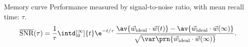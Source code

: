 \documentclass[final,hyperref={pdfpagelabels=false,bookmarks=false}]{beamer}
\DeclareMathOperator{\SNR}{SNR}
\DeclareMathOperator{\snr}{SNR}
\newcommand{\snrb}{\overline{\snr}}
\newcommand{\SNRb}{\snrb}
\newcommand{\pot}{^\text{pot}}
\newcommand{\dep}{^\text{dep}}
\newcommand{\I}{\mathbf{I}}
\newcommand{\eq}{\mathbf{p}^\infty}
\newcommand{\w}{\mathbf{w}}
\newcommand{\W}{\vec{w}}
\newcommand{\M}{\mathbf{M}}
\begin{document}
\begin{frame}{}
\begin{columns}[t]
\begin{column}{0.33\linewidth}
\begin{block}{Memory curve}
 \vp Performance measured by signal-to-noise ratio, with mean recall time: $\tau$.
 \begin{equation*}
   \begin{aligned}
     \SNRb(\tau) = \frac{1}{\tau}\intd[_0^\infty]{t}\e^{-t/\tau}\, \frac{\av{\W_\text{ideal} \cdot \W(t)} -  \av{\W_\text{ideal} \cdot \W(\infty)} }{ \sqrt{\var\prn{\W_\text{ideal} \cdot \W(\infty)}} }.
   \end{aligned}
 \end{equation*}
%
\end{block}


\end{column}
\end{columns}
\end{frame}
\end{document}
